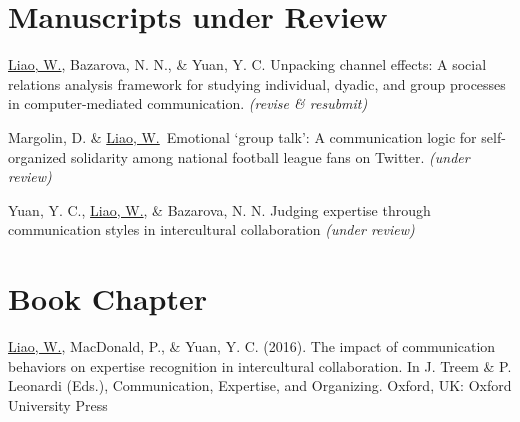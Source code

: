 \documentclass[11pt, letterpaper]{article} %
\newcommand{\years}[1]{\leavevmode\marginnote{\scriptsize #1}} %
\begin{document}

\section*{Manuscripts under Review}

\begin{hangparas}{.25in}{1}

\underline{Liao, W.}, Bazarova, N. N., \& Yuan, Y. C. Unpacking channel effects: A social relations analysis framework for studying individual, dyadic, and group processes in computer-mediated communication. \textsl{(revise \& resubmit)}

Margolin, D. \& \underline{Liao, W.}~Emotional ‘group talk’: A communication logic for self-organized solidarity among national football league fans on Twitter. \textsl{(under review)}

Yuan, Y. C., \underline{Liao, W.}, \& Bazarova, N. N. Judging expertise through communication styles in intercultural collaboration \textsl{(under review)}

\end{hangparas}


\section*{Book Chapter}
\begin{hangparas}{.25in}{1}

    \underline{Liao, W.}, \years{2016}  MacDonald, P., \& Yuan, Y. C. (2016). The impact of communication behaviors on expertise recognition in intercultural collaboration. In J. Treem \& P. Leonardi (Eds.), Communication, Expertise, and Organizing. Oxford, UK: Oxford University Press

\end{hangparas}

\end{document}
